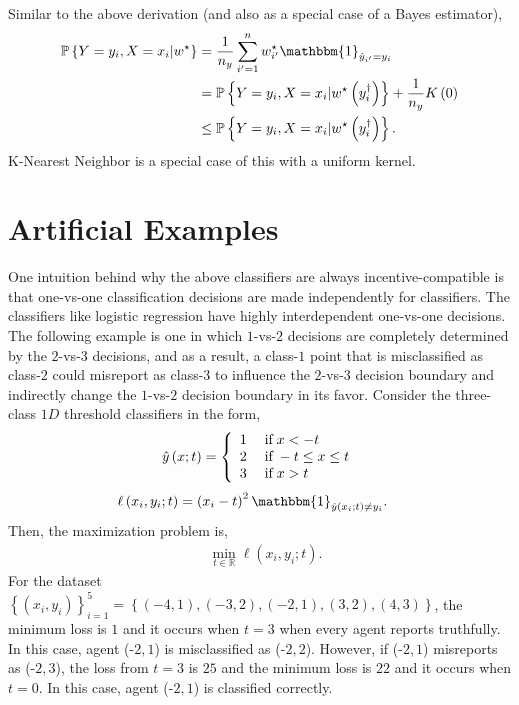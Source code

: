\documentclass{article}
\begin{document}
Similar to the above derivation (and also as a special case of a Bayes estimator),
\begin{align*}
\mathbb{P}\left\{Y = y_{i}, X = x_{i} | w^\star \right\} &= \dfrac{1}{n_{y}} \displaystyle\sum_{i'=1}^{n} w^\star _{i'} \mathbbm{1}_{\hat{y}_{i'} = y_{i}}
\\ &= \mathbb{P}\left\{Y = y_{i}, X = x_{i} | w^\star \left(y^{\dagger}_{i}\right)\right\} + \dfrac{1}{n_{y}} K\left(0\right)
\\ &\leq  \mathbb{P}\left\{Y = y_{i}, X = x_{i} | w^\star \left(y^{\dagger}_{i}\right)\right\}.
\end{align*}
K-Nearest Neighbor is a special case of this with a uniform kernel.
\newline \newline



\section{Artificial Examples} 
One intuition behind why the above classifiers are always incentive-compatible is that one-vs-one classification decisions are made independently for classifiers. The classifiers like logistic regression have highly interdependent one-vs-one decisions. The following example is one in which $1$-vs-$2$ decisions are completely determined by the $2$-vs-$3$ decisions, and as a result, a class-$1$ point that is misclassified as class-$2$ could misreport as class-$3$ to influence the $2$-vs-$3$ decision boundary and indirectly change the $1$-vs-$2$ decision boundary in its favor.
\newline \newline
Consider the three-class $1D$ threshold classifiers in the form,
\[ \hat{y}\left(x; t\right) =\left\{ \begin{array}{ll}
1& \text{\;if\;} x < -t \\
2& \text{\;if\;} -t \leq  x \leq  t \\
3& \text{\;if\;} x > t \\
\end{array}\right. \]
\begin{align*}
\ell\left(x_{i}, y_{i}; t\right) &= \left(x_{i} - t\right)^{2} \mathbbm{1}_{\hat{y}\left(x_{i}; t\right) \neq  y_{i}}.
\end{align*}
Then, the maximization problem is,
\begin{align*}
&\displaystyle\min_{t \in \mathbb{R}} \ell\left(x_{i}, y_{i}; t\right).
\end{align*}
For the dataset $\left\{\left(x_{i}, y_{i}\right)\right\}_{i=1}^{5} = \left\{\left(-4, 1\right), \left(-3, 2\right), \left(-2, 1\right), \left(3, 2\right), \left(4, 3\right)\right\}$, the minimum loss is $1$ and it occurs when $t  = 3$ when every agent reports truthfully. In this case, agent (-$2, 1$) is misclassified as (-$2, 2$). However, if (-$2, 1$) misreports as (-$2, 3$), the loss from $t  = 3$ is $25$ and the minimum loss is $22$ and it occurs when $t  = 0$. In this case, agent (-$2, 1$) is classified correctly.
\newline \newline
\end{document}
